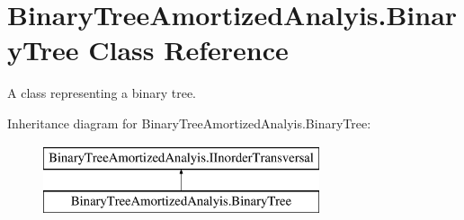 \hypertarget{class_binary_tree_amortized_analyis_1_1_binary_tree}{}\section{Binary\+Tree\+Amortized\+Analyis.\+Binary\+Tree Class Reference}
\label{class_binary_tree_amortized_analyis_1_1_binary_tree}


A class representing a binary tree.  


Inheritance diagram for Binary\+Tree\+Amortized\+Analyis.\+Binary\+Tree\+:\begin{figure}[H]
\begin{center}
\leavevmode
\includegraphics[height=2.000000cm]{class_binary_tree_amortized_analyis_1_1_binary_tree}
\end{center}
\end{figure}
